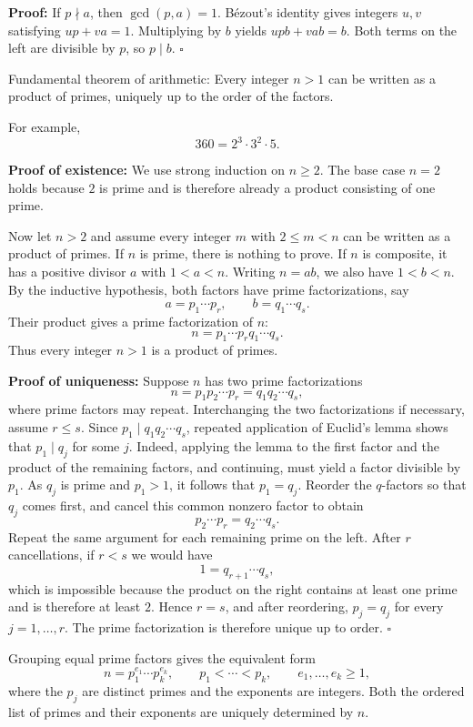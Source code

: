 \documentclass[a4paper,11pt,abstracton]{scrartcl}
\theoremstyle{dotlessP}
\theoremstyle{dotlessS}
\theoremstyle{remark}
\theoremstyle{definition}
\begin{document}
\textbf{Proof:}
If $p\nmid a$, then $\gcd(p,a)=1$. B\'ezout's identity gives integers
$u,v$ satisfying $up+va=1$. Multiplying by $b$ yields $upb+vab=b$.
Both terms on the left are divisible by $p$, so $p\mid b$.
\hfill$\square$


\begin{mainbox}{Fundamental theorem of arithmetic:}
Every integer $n>1$ can be written as a product of primes, uniquely up
to the order of the factors.
\end{mainbox}
\begin{example_box}
For example,
\[
    360=2^3\cdot3^2\cdot5.
\]
\end{example_box}

\textbf{Proof of existence:}
We use strong induction on $n\geq2$. The base case $n=2$ holds because
$2$ is prime and is therefore already a product consisting of one prime.

Now let $n>2$ and assume every integer $m$ with $2\leq m<n$ can be
written as a product of primes. If $n$ is prime, there is nothing to
prove. If $n$ is composite, it has a positive divisor $a$ with
$1<a<n$. Writing $n=ab$, we also have $1<b<n$.
By the inductive hypothesis, both factors have prime factorizations,
say
\[
    a=p_1\cdots p_r,\qquad b=q_1\cdots q_s.
\]
Their product gives a prime factorization of $n$:
\[
    n=p_1\cdots p_rq_1\cdots q_s.
\]
Thus every integer $n>1$ is a product of primes.


\textbf{Proof of uniqueness:}
Suppose $n$ has two prime factorizations
\[
    n=p_1p_2\cdots p_r=q_1q_2\cdots q_s,
\]
where prime factors may repeat. Interchanging the two factorizations
if necessary, assume $r\leq s$.
Since $p_1\mid q_1q_2\cdots q_s$, repeated application of Euclid's
lemma shows that $p_1\mid q_j$ for some $j$. Indeed, applying the
lemma to the first factor and the product of the remaining factors,
and continuing, must yield a factor divisible by $p_1$.
As $q_j$ is prime and $p_1>1$, it follows that $p_1=q_j$.
Reorder the $q$-factors so that $q_j$ comes first, and cancel this
common nonzero factor to obtain
\[
    p_2\cdots p_r=q_2\cdots q_s.
\]
Repeat the same argument for each remaining prime on the left.
After $r$ cancellations, if $r<s$ we would have
\[
    1=q_{r+1}\cdots q_s,
\]
which is impossible because the product on the right contains at least
one prime and is therefore at least $2$. Hence $r=s$, and after
reordering, $p_j=q_j$ for every $j=1,\ldots,r$.
The prime factorization is therefore unique up to order.
\hfill$\square$


Grouping equal prime factors gives the equivalent form
\[
    n=p_1^{e_1}\cdots p_k^{e_k},
    \qquad p_1<\cdots<p_k,\qquad e_1,\ldots,e_k\geq1,
\]
where the $p_j$ are distinct primes and the exponents are integers.
Both the ordered list of primes and their exponents are uniquely
determined by $n$.
\end{document}

